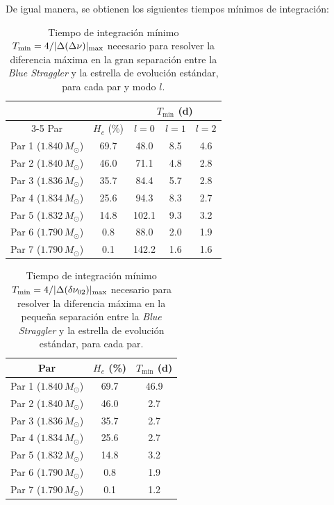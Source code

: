 De igual manera, se obtienen los siguientes tiempos mínimos de integración:

\begin{table}[H]
  \centering
  \begin{tabular}{
      c
      c
      c
      c
      c
    }
    \toprule
    & & \multicolumn{3}{c}{$T_{\min}$ (d)} \\
    \cmidrule(lr){3-5}
    {Par} & {$H_c$ (\%)} & {$l = 0$} & {$l = 1$} & {$l = 2$} \\
    \midrule
    Par 1 ($1.840\,M_\odot$) & 69.7 & 48.0 & 8.5 & 4.6 \\
    Par 2 ($1.840\,M_\odot$) & 46.0 & 71.1 & 4.8 & 2.8 \\
    Par 3 ($1.836\,M_\odot$) & 35.7 & 84.4 & 5.7 & 2.8 \\
    Par 4 ($1.834\,M_\odot$) & 25.6 & 94.3 & 8.3 & 2.7 \\
    Par 5 ($1.832\,M_\odot$) & 14.8 & 102.1 & 9.3 & 3.2 \\
    Par 6 ($1.790\,M_\odot$) &  0.8 & 88.0 & 2.0 & 1.9 \\
    Par 7 ($1.790\,M_\odot$) &  0.1 & 142.2 &  1.6 & 1.6 \\
    \bottomrule
  \end{tabular}
  \caption{Tiempo de integración mínimo $T_{\protect\min} = 4/|\Delta(\Delta\nu)|_{\protect\max}$ necesario para resolver la diferencia máxima en la gran separación entre la \textit{Blue Straggler} y la estrella de evolución estándar, para cada par y modo $l$.}
  \label{tab:tmin_gran_sep}
\end{table}

\begin{table}[H]
  \centering
  \begin{tabular}{
      c
      c
      c
    }
    \toprule
    {Par} & {$H_c$ (\%)} & {$T_{\min}$ (d)} \\
    \midrule
    Par 1 ($1.840\,M_\odot$) & 69.7 & 46.9 \\
    Par 2 ($1.840\,M_\odot$) & 46.0 &  2.7 \\
    Par 3 ($1.836\,M_\odot$) & 35.7 &  2.7 \\
    Par 4 ($1.834\,M_\odot$) & 25.6 &  2.7 \\
    Par 5 ($1.832\,M_\odot$) & 14.8 &  3.2 \\
    Par 6 ($1.790\,M_\odot$) &  0.8 &  1.9 \\
    Par 7 ($1.790\,M_\odot$) &  0.1 &  1.2 \\
    \bottomrule
  \end{tabular}
  \caption{Tiempo de integración mínimo $T_{\protect\min} = 4/|\Delta(\delta\nu_{02})|_{\protect\max}$ necesario para resolver la diferencia máxima en la pequeña separación entre la \textit{Blue Straggler} y la estrella de evolución estándar, para cada par.}
  \label{tab:tmin_peq_sep}
\end{table}

